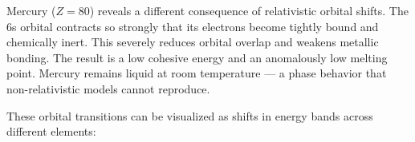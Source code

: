 Mercury ($Z = 80$) reveals a different consequence of relativistic orbital shifts. The 6s orbital contracts so strongly that its electrons become tightly bound and chemically inert. This severely reduces orbital overlap and weakens metallic bonding. The result is a low cohesive energy and an anomalously low melting point. Mercury remains liquid at room temperature — a phase behavior that non-relativistic models cannot reproduce.

\clearpage

These orbital transitions can be visualized as shifts in energy bands across different elements:

\usetikzlibrary{arrows.meta, positioning, backgrounds, calc}


